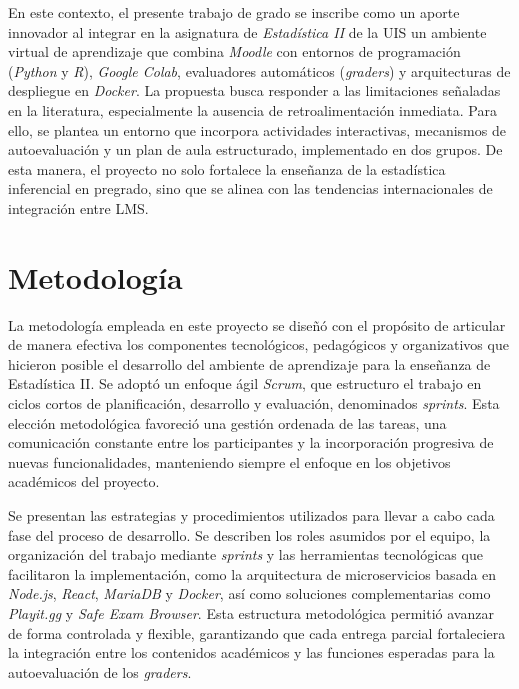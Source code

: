 \documentclass[letter,oneside,12pt,spanish]{report}
\begin{document}
En este contexto, el presente trabajo de grado se inscribe como un aporte innovador al 
integrar en la asignatura de \textit{Estadística II} de la UIS un ambiente virtual de aprendizaje 
que combina \textit{Moodle} con entornos de programación (\textit{Python} y \textit{R}), 
\textit{Google Colab}, evaluadores automáticos (\textit{graders}) y arquitecturas de despliegue en 
\textit{Docker}. La propuesta busca responder a las limitaciones señaladas en la literatura, 
especialmente la ausencia de retroalimentación inmediata. Para ello, se plantea un entorno que 
incorpora actividades interactivas, mecanismos de autoevaluación y un plan de aula estructurado, 
implementado en dos grupos. De esta manera, el proyecto no solo fortalece la enseñanza de la 
estadística inferencial en pregrado, sino que se alinea con las tendencias internacionales de 
integración entre LMS.

\newpage

\chapter{Metodología}

La metodología empleada en este proyecto se diseñó con el propósito de articular de manera efectiva los componentes tecnológicos, pedagógicos y organizativos que hicieron posible el desarrollo del ambiente de aprendizaje para la enseñanza de Estadística II. Se adoptó un enfoque ágil \textit{Scrum}, que estructuro el trabajo en ciclos cortos de planificación, desarrollo y evaluación, denominados \textit{sprints}. Esta elección metodológica favoreció una gestión ordenada de las tareas, una comunicación constante entre los participantes y la incorporación progresiva de nuevas funcionalidades, manteniendo siempre el enfoque en los objetivos académicos del proyecto.

Se presentan las estrategias y procedimientos utilizados para llevar a cabo cada fase del proceso de desarrollo. Se describen los roles asumidos por el equipo, la organización del trabajo mediante \textit{sprints} y las herramientas tecnológicas que facilitaron la implementación, como la arquitectura de microservicios basada en \textit{Node.js}, \textit{React}, \textit{MariaDB} y \textit{Docker}, así como soluciones complementarias como \textit{Playit.gg} y \textit{Safe Exam Browser}. Esta estructura metodológica permitió avanzar de forma controlada y flexible, garantizando que cada entrega parcial fortaleciera la integración entre los contenidos académicos y las funciones esperadas para la autoevaluación de los \textit{graders}.
\end{document}
